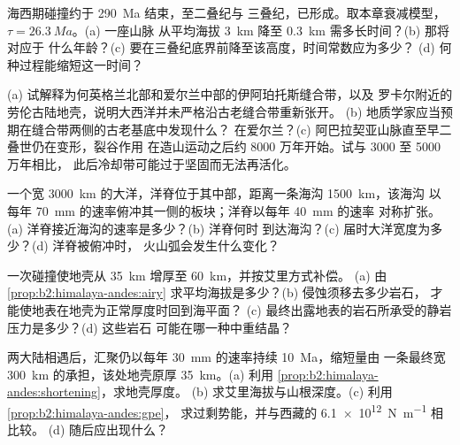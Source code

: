 \begin{exercise}[$\star\star$]\label{exo:b2:wilson-cycle:8}
海西期碰撞约于 \qty{290}{Ma} 结束，至二叠纪与
三叠纪，已形成。取本章衰减模型，$\tau = \qty{26.3}{Ma}$。(a) 一座山脉
从平均海拔 \qty{3}{km} 降至 \qty{0.3}{km} 需多长时间？(b) 那将对应于
什么年龄？(c) 要在三叠纪底界前降至该高度，时间常数应为多少？
(d) 何种过程能缩短这一时间？
\end{exercise}

\begin{exercise}[$\star\star$]\label{exo:b2:wilson-cycle:9}
(a) 试解释为何英格兰北部和爱尔兰中部的伊阿珀托斯缝合带，以及
罗卡尔附近的劳伦古陆地壳，说明大西洋并未严格沿古老缝合带重新张开。
(b) 地质学家应当预期在缝合带两侧的古老基底中发现什么？
在爱尔兰？(c) 阿巴拉契亚山脉直至早二叠世仍在变形，裂谷作用
在造山运动之后约 8000 万年开始。试与 3000 至 5000 万年相比，
此后冷却带可能过于坚固而无法再活化。
\end{exercise}

\begin{exercise}[$\star\star\star$]\label{exo:b2:wilson-cycle:10}
一个宽 \qty{3000}{km} 的大洋，洋脊位于其中部，距离一条海沟 \qty{1500}{km}，该海沟
以每年 \qty{70}{mm} 的速率俯冲其一侧的板块；洋脊以每年 \qty{40}{mm} 的速率
对称扩张。(a) 洋脊接近海沟的速率是多少？(b) 洋脊何时
到达海沟？(c) 届时大洋宽度为多少？(d) 洋脊被俯冲时，
火山弧会发生什么变化？
\end{exercise}

\begin{exercise}[$\star\star\star$]\label{exo:b2:wilson-cycle:11}
一次碰撞使地壳从 \qty{35}{km} 增厚至 \qty{60}{km}，并按艾里方式补偿。
(a) 由 \cref{prop:b2:himalaya-andes:airy} 求平均海拔是多少？(b) 侵蚀须移去多少岩石，
才能使地表在地壳为正常厚度时回到海平面？
(c) 最终出露地表的岩石所承受的静岩压力是多少？(d) 这些岩石
可能在哪一种中重结晶？
\end{exercise}

\begin{exercise}[$\star\star\star$]\label{exo:b2:wilson-cycle:12}
两大陆相遇后，汇聚仍以每年 \qty{30}{mm} 的速率持续 \qty{10}{Ma}，缩短量由
一条最终宽 \qty{300}{km} 的承担，该处地壳原厚
\qty{35}{km}。(a) 利用 \cref{prop:b2:himalaya-andes:shortening}，求地壳厚度。
(b) 求艾里海拔与山根深度。(c) 利用 \cref{prop:b2:himalaya-andes:gpe}，
求过剩势能，并与西藏的 \qty{6.1e12}{N.m^{-1}} 相比较。
(d) 随后应出现什么？
\end{exercise}

